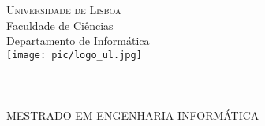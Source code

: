 
\pagestyle{empty}

\begin{center}
\vspace{3cm}\normalfont\normalfont
\textsc{\huge{Universidade de Lisboa}}\\
\LARGE{Faculdade de Ci\^{e}ncias}\\
\Large{Departamento de Inform\'{a}tica}\\
\vspace{1cm}
\texttt{[image: pic/logo\_ul.jpg]}\\

\vspace{2cm}
\PEIIdiomaTese
\Large{\bf \PEITITULO}\\
\vspace{1cm}
\vspace{0.7cm}
\vspace{0.7cm}
\Large{\bf \PEIAutor}\\
\vspace{2.4cm}
\Large{\bf \PEITIPO}\\
\vfill
\Large{MESTRADO EM ENGENHARIA INFORM\'{A}TICA}\\
\vfill
\PEIAno
\end{center}
\newpage
\mbox{}
\newpage

\setcounter{page}{1}


